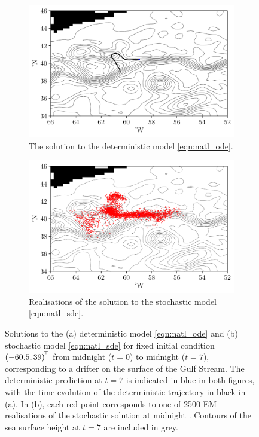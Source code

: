 \begin{figure}
	\begin{center}
		\begin{subfigure}[t]{0.7\textwidth}
			\includegraphics[width=\textwidth]{chp06_applications/figures/gulf_stream/det_traj.pdf}
			\caption{The solution to the deterministic model \cref{eqn:natl_ode}.}
			\label{fig:natl_det_traj}
		\end{subfigure}
		\begin{subfigure}[t]{0.7\textwidth}
			\includegraphics[width=\textwidth]{chp06_applications/figures/gulf_stream/traj_stoch_rels}
			\caption{Realisations of the solution to the stochastic model \cref{eqn:natl_sde}.}
			\label{fig:natl_stoch_rels}
		\end{subfigure}
		\caption{Solutions to the (a) deterministic model \cref{eqn:natl_ode} and (b) stochastic model \cref{eqn:natl_sde} for fixed initial condition \((-60.5, 39)^{^{\!\top}}\) from midnight  (\(t = 0\)) to midnight  (\(t = 7\)), corresponding to a drifter on the surface of the Gulf Stream.
			The deterministic prediction at \(t = 7\) is indicated in blue in both figures, with the time evolution of the deterministic trajectory in black in (a).
			In (b), each red point corresponds to one of 2500 EM realisations of the stochastic solution at midnight .
			Contours of the sea surface height at \(t = 7\) are included in grey.}
	\end{center}
\end{figure}


